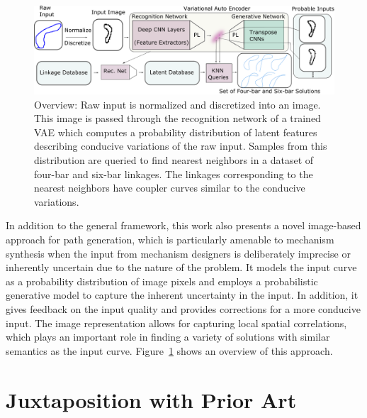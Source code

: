 \begin{figure}[tbh]
\centering
\includegraphics[width=\textwidth]{idetc-20/figure/fig_overview.eps}
  \caption{Overview: Raw input is normalized and discretized into an image. This image is passed through the recognition network of a trained VAE which computes a probability distribution of latent features describing conducive variations of the raw input. Samples from this distribution are queried to find nearest neighbors in a dataset of four-bar and six-bar linkages. The linkages corresponding to the nearest neighbors have coupler curves similar to the conducive variations.}
\label{fig_contrasting_overview}
\end{figure}

In addition to the general framework, this work also presents a novel image-based approach for path generation, which is particularly amenable to mechanism synthesis when the input from mechanism designers is deliberately imprecise or inherently uncertain due to the nature of the problem. It models the input curve as a probability distribution of image pixels and employs a probabilistic generative model to capture the inherent uncertainty in the input. In addition, it gives feedback on the input quality and provides corrections for a more conducive input. The image representation allows for capturing local spatial correlations, which plays an important role in finding a variety of solutions with similar semantics as the input curve. Figure~\ref{fig_contrasting_overview} shows an overview of this approach.
 


\section{Juxtaposition with Prior Art}

